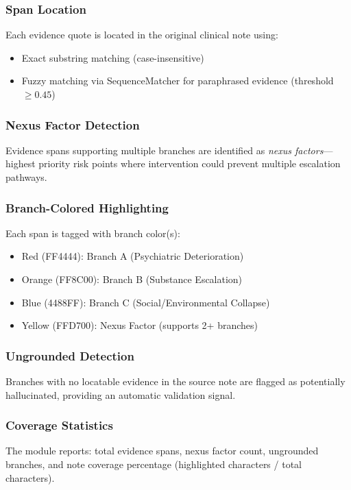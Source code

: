 \documentclass[conference]{IEEEtran}
\begin{document}
\subsubsection{Span Location}
Each evidence quote is located in the original clinical note using:
\begin{itemize}
\item Exact substring matching (case-insensitive)
\item Fuzzy matching via SequenceMatcher for paraphrased evidence (threshold $\geq 0.45$)
\end{itemize}

\subsubsection{Nexus Factor Detection}
Evidence spans supporting multiple branches are identified as \textit{nexus factors}---highest priority risk points where intervention could prevent multiple escalation pathways.

\subsubsection{Branch-Colored Highlighting}
Each span is tagged with branch color(s):
\begin{itemize}
\item Red (FF4444): Branch A (Psychiatric Deterioration)
\item Orange (FF8C00): Branch B (Substance Escalation)
\item Blue (4488FF): Branch C (Social/Environmental Collapse)
\item Yellow (FFD700): Nexus Factor (supports 2+ branches)
\end{itemize}

\subsubsection{Ungrounded Detection}
Branches with no locatable evidence in the source note are flagged as potentially hallucinated, providing an automatic validation signal.

\subsubsection{Coverage Statistics}
The module reports: total evidence spans, nexus factor count, ungrounded branches, and note coverage percentage (highlighted characters / total characters).
\end{document}
